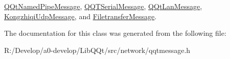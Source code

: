 \mbox{\hyperlink{class_q_qt_named_pipe_message_aaf7e90af917029afb616efc4d8141073}{Q\+Qt\+Named\+Pipe\+Message}}, \mbox{\hyperlink{class_q_q_t_serial_message_a9533887dc0566c5ee16990b323df94ef}{Q\+Q\+T\+Serial\+Message}}, \mbox{\hyperlink{class_q_qt_lan_message_a778629e75eb24a48b54988b25bd32250}{Q\+Qt\+Lan\+Message}}, \mbox{\hyperlink{class_kongzhiqi_udp_message_ae86374489ef208d173e840b050f1b212}{Kongzhiqi\+Udp\+Message}}, and \mbox{\hyperlink{class_filetransfer_message_a3f25d77aadf5f260ef3696d9bec4b34e}{Filetransfer\+Message}}.



The documentation for this class was generated from the following file\+:\begin{DoxyCompactItemize}
\item 
R\+:/\+Develop/a0-\/develop/\+Lib\+Q\+Qt/src/network/qqtmessage.\+h\end{DoxyCompactItemize}
